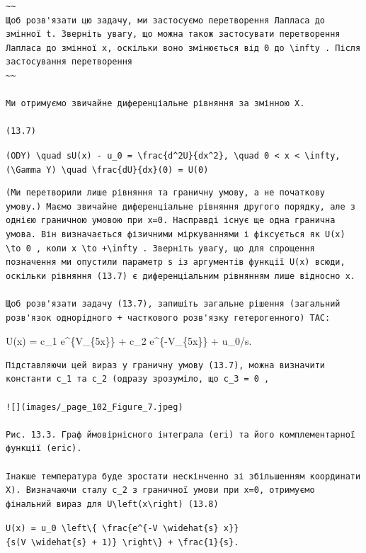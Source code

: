 \documentclass[
  ukrainian,
]{article}
\begin{document}
\begin{verbatim}
~~
Щоб розв'язати цю задачу, ми застосуємо перетворення Лапласа до змінної t. Зверніть увагу, що можна також застосувати перетворення Лапласа до змінної x, оскільки воно змінюється від 0 до \infty . Після застосування перетворення
~~

Ми отримуємо звичайне диференціальне рівняння за змінною X.

(13.7)
\end{verbatim}

\texttt{(ODY)\ \textbackslash{}quad\ sU(x)\ -\ u\_0\ =\ \textbackslash{}frac\{d\^{}2U\}\{dx\^{}2\},\ \textbackslash{}quad\ 0\ \textless{}\ x\ \textless{}\ \textbackslash{}infty,}
\texttt{(\textbackslash{}Gamma\ Y)\ \textbackslash{}quad\ \textbackslash{}frac\{dU\}\{dx\}(0)\ =\ U(0)}

\begin{verbatim}
(Ми перетворили лише рівняння та граничну умову, а не початкову умову.) Маємо звичайне диференціальне рівняння другого порядку, але з однією граничною умовою при x=0. Насправді існує ще одна гранична умова. Він визначається фізичними міркуваннями і фіксується як U(x) \to 0 , коли x \to +\infty . Зверніть увагу, що для спрощення позначення ми опустили параметр s із аргументів функції U(x) всюди, оскільки рівняння (13.7) є диференціальним рівнянням лише відносно x.

Щоб розв'язати задачу (13.7), запишіть загальне рішення (загальний розв'язок однорідного + часткового розв'язку гетерогенного) TAC:
\end{verbatim}

U(x) = c\_1 e\^{}\{V\_\{5x\}\} + c\_2 e\^{}\{-V\_\{5x\}\} + u\_0/s.

\begin{verbatim}
Підставляючи цей вираз у граничну умову (13.7), можна визначити константи c_1 та c_2 (одразу зрозуміло, що c_3 = 0 ,

![](images/_page_102_Figure_7.jpeg)

Рис. 13.3. Граф ймовірнісного інтеграла (eri) та його комплементарної функції (eric).

Інакше температура буде зростати нескінченно зі збільшенням координати X). Визначаючи сталу c_2 з граничної умови при x=0, отримуємо фінальний вираз для U\left(x\right) (13.8)
\end{verbatim}

\texttt{U(x)\ =\ u\_0\ \textbackslash{}left\textbackslash{}\{\ \textbackslash{}frac\{e\^{}\{-V\ \textbackslash{}widehat\{s\}\ x\}\}\{s(V\ \textbackslash{}widehat\{s\}\ +\ 1)\}\ \textbackslash{}right\textbackslash{}\}\ +\ \textbackslash{}frac\{1\}\{s\}.}
\end{document}
